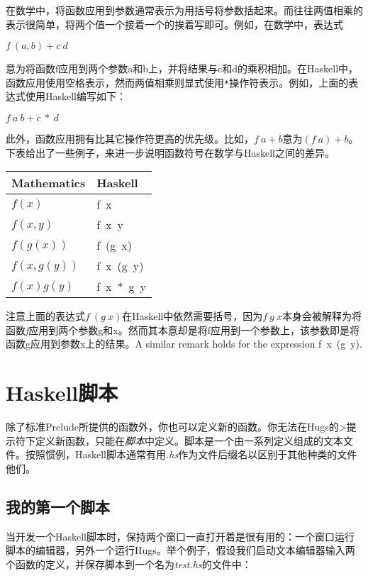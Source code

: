 在数学中，将函数应用到参数通常表示为用括号将参数括起来。而往往两值相乘的表示很简单，将两个值一个接着一个的挨着写即可。例如，在数学中，表达式

\noindent\hspace*{1cm} $f~(a, b) + c~ d$

意为将函数f应用到两个参数a和b上，并将结果与c和d的乘积相加。在Haskell中，函数应用使用空格表示，然而两值相乘则显式使用\verb|*|操作符表示。例如，上面的表达式使用Haskell编写如下：

\noindent\hspace*{1cm} $f~a~b + c~*~d$

此外，函数应用拥有比其它操作符更高的优先级。比如，$f~a + b$意为$(f~a) +
b$。下表给出了一些例子，来进一步说明函数符号在数学与Haskell之间的差异。

\begin{table}[htbp]
\label{tab:threesome}
\centering
\begin{tabular}{ll}
\hline
Mathematics & Haskell  \\
\hline
$f(x)$ & f~x \\
$f(x,y)$ & f~x~y \\
$f(g(x))$ & f~(g~x) \\
$f(x,g(y))$ & f~x~(g~y)\\
$f(x)g(y)$ & f~x~*~g~y\\
\hline
\end{tabular}
\end{table}

注意上面的表达式$f~(g~x)$在Haskell中依然需要括号，因为$f~g~
x$本身会被解释为将函数\textit{f}应用到两个参数g和x。然而其本意却是将f应用到一个参数上，该参数即是将函数g应用到参数x上的结果。A similar remark holds for the expression f~x~(g~y).

\section{Haskell脚本}
除了标准Prelude所提供的函数外，你也可以定义新的函数。你无法在Hugs的>提示符下定义新函数，只能在\textit{脚本}中定义。脚本是一个由一系列定义组成的文本文件。按照惯例，Haskell脚本通常有用\textit{.hs}作为文件后缀名以区别于其他种类的文件他们。

\subsection{我的第一个脚本}
当开发一个Haskell脚本时，保持两个窗口一直打开着是很有用的：一个窗口运行脚本的编辑器，另外一个运行Hugs。举个例子，假设我们启动文本编辑器输入两个函数的定义，并保存脚本到一个名为\textit{test.hs}的文件中：

